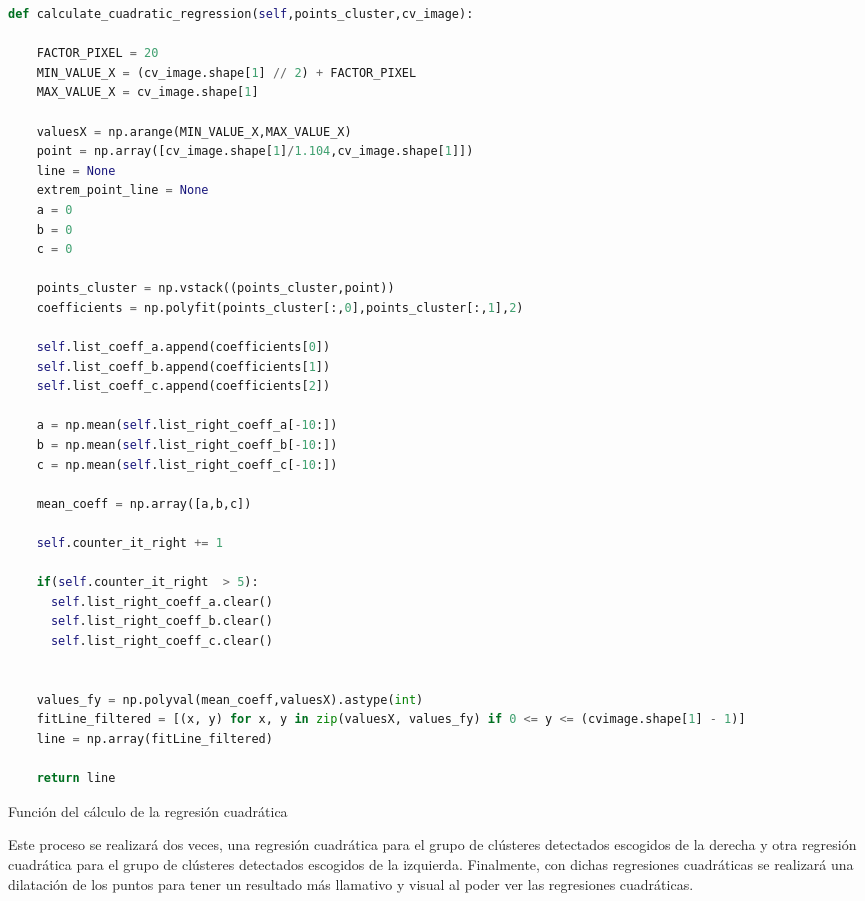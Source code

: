 \begin{code}[H]
  \begin{lstlisting}[language=Python]
    def calculate_cuadratic_regression(self,points_cluster,cv_image):

    FACTOR_PIXEL = 20
    MIN_VALUE_X = (cv_image.shape[1] // 2) + FACTOR_PIXEL
    MAX_VALUE_X = cv_image.shape[1]
  
    valuesX = np.arange(MIN_VALUE_X,MAX_VALUE_X) 
    point = np.array([cv_image.shape[1]/1.104,cv_image.shape[1]])
    line = None
    extrem_point_line = None
    a = 0
    b = 0
    c = 0

    points_cluster = np.vstack((points_cluster,point))
    coefficients = np.polyfit(points_cluster[:,0],points_cluster[:,1],2)

    self.list_coeff_a.append(coefficients[0])
    self.list_coeff_b.append(coefficients[1])
    self.list_coeff_c.append(coefficients[2])

    a = np.mean(self.list_right_coeff_a[-10:])
    b = np.mean(self.list_right_coeff_b[-10:])
    c = np.mean(self.list_right_coeff_c[-10:])

    mean_coeff = np.array([a,b,c])

    self.counter_it_right += 1

    if(self.counter_it_right  > 5):
      self.list_right_coeff_a.clear()
      self.list_right_coeff_b.clear()
      self.list_right_coeff_c.clear()  


    values_fy = np.polyval(mean_coeff,valuesX).astype(int)
    fitLine_filtered = [(x, y) for x, y in zip(valuesX, values_fy) if 0 <= y <= (cvimage.shape[1] - 1)]
    line = np.array(fitLine_filtered)
     
    return line

  \end{lstlisting}
  \caption[Función del cálculo de la regresión cuadrática]{Función del cálculo de la regresión cuadrática}
  \label{cod:codejemplo}
  \end{code}  

Este proceso se realizará dos veces, una regresión cuadrática para el grupo de clústeres detectados escogidos de la derecha y otra regresión cuadrática para el grupo de clústeres detectados
escogidos de la izquierda. \newline
Finalmente, con dichas regresiones cuadráticas se realizará una dilatación de los puntos para tener un resultado más llamativo y visual al poder
ver las regresiones cuadráticas.\newline

